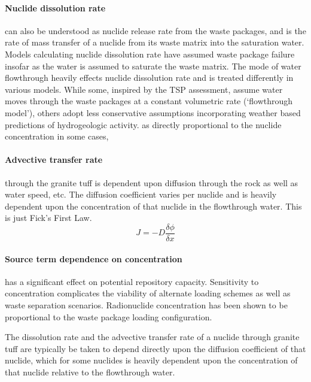 

\paragraph{Nuclide dissolution rate} can also be understood as nuclide release rate from the waste 
packages, and is the rate of mass transfer of a nuclide from its waste matrix into the saturation 
water. Models calculating  nuclide dissolution rate have assumed waste package failure insofar as 
the water is assumed to saturate the waste matrix. The mode of water flowthrough heavily effects 
nuclide dissolution rate and is treated differently in various models. While some, inspired by the 
TSP assessment, assume water moves through the waste packages at a constant volumetric rate 
(`flowthrough model'), others adopt less conservative assumptions incorporating weather based 
predictions of hydrogeologic activity. as directly proportional to the nuclide concentration in some 
cases,  \paragraph{Advective transfer rate} through the granite tuff is dependent upon diffusion 
through the rock as well as water speed, etc. The diffusion coefficient varies per nuclide and is 
heavily dependent upon the concentration of that nuclide in the flowthrough water. This is just 
Fick's First Law.  \begin{equation}
J = -D\frac{\delta\phi}{\delta x}
\end{equation}

\paragraph{Source term dependence on concentration} has a significant effect on potential repository 
capacity. Sensitivity to concentration complicates the viability of alternate loading schemes as 
well as waste separation scenarios. Radionuclide concentration has been shown to be proportional to 
the waste package loading configuration.\cite{ahn_relationship_2002,kawasaki_congruent_2004}

The dissolution rate and the advective transfer rate of a nuclide through granite tuff are typically 
be taken to depend directly upon the diffusion coefficient of that nuclide, which for some nuclides 
is heavily dependent upon the concentration of that nuclide relative to the flowthrough water. 

